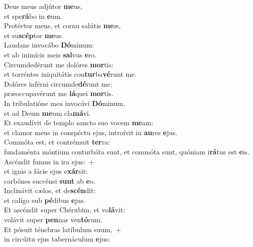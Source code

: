 \evenverse Deus meus adjútor \textbf{me}us,~\*\\
\evenverse et spe\textbf{rá}bo in \textbf{e}um.\\
\oddverse Protéctor meus, et cornu salútis \textbf{me}æ,~\*\\
\oddverse et su\textbf{scép}tor \textbf{me}us.\\
\evenverse Laudans invocábo \textbf{Dó}minum:~\*\\
\evenverse et ab inimícis meis \textbf{sal}vus \textbf{e}ro.\\
\oddverse Circumdedérunt me dolóres \textbf{mor}tis:~\*\\
\oddverse et torréntes iniquitátis con\textbf{tur}ba\textbf{vé}runt me.\\
\evenverse Dolóres inférni circumde\textbf{dé}runt me:~\*\\
\evenverse præoccupavérunt me \textbf{lá}quei \textbf{mor}tis.\\
\oddverse In tribulatióne mea invocávi \textbf{Dó}minum,~\*\\
\oddverse et ad Deum \textbf{me}um cla\textbf{má}vi.\\
\evenverse Et exaudívit de templo sancto suo vocem \textbf{me}am:~\*\\
\evenverse et clamor meus in conspéctu ejus, introívit in \textbf{au}res \textbf{e}jus.\\
\oddverse Commóta est, et contrémuit \textbf{ter}ra:~\*\\
\oddverse fundaménta móntium conturbáta sunt, et commóta sunt, quóniam i\textbf{rá}tus est \textbf{e}is.\\
\evenverse Ascéndit fumus in ira ejus:~+\\
\evenverse  et ignis a fácie ejus e\textbf{xár}sit:~\*\\
\evenverse carbónes succénsi \textbf{sunt} ab \textbf{e}o.\\
\oddverse Inclinávit cælos, et de\textbf{scén}dit:~\*\\
\oddverse et calígo sub \textbf{pé}dibus \textbf{e}jus.\\
\evenverse Et ascéndit super Chérubim, et vo\textbf{lá}vit:~\*\\
\evenverse volávit super \textbf{pen}nas ven\textbf{tó}rum.\\
\oddverse Et pósuit ténebras latíbulum suum,~+\\
\oddverse  in circúitu ejus tabernáculum \textbf{e}jus:~\*\\

